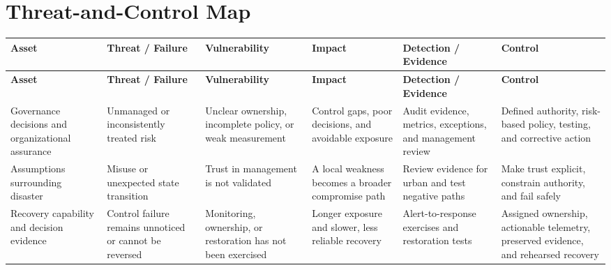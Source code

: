 \documentclass[11pt,letterpaper]{article}
\begin{document}
\section*{Threat-and-Control Map}
\begingroup\scriptsize\setlength{\tabcolsep}{2pt}
\begin{longtable}{>{\raggedright\arraybackslash}p{}>{\raggedright\arraybackslash}p{}>{\raggedright\arraybackslash}p{}>{\raggedright\arraybackslash}p{}>{\raggedright\arraybackslash}p{}>{\raggedright\arraybackslash}p{}}
\toprule\rowcolor{Navy}\color{white}\textbf{Asset} & \color{white}\textbf{Threat / Failure} & \color{white}\textbf{Vulnerability} & \color{white}\textbf{Impact} & \color{white}\textbf{Detection / Evidence} & \color{white}\textbf{Control}\\\midrule
\endfirsthead
\toprule\rowcolor{Navy}\color{white}\textbf{Asset} & \color{white}\textbf{Threat / Failure} & \color{white}\textbf{Vulnerability} & \color{white}\textbf{Impact} & \color{white}\textbf{Detection / Evidence} & \color{white}\textbf{Control}\\\midrule
\endhead
Governance decisions and organizational assurance & Unmanaged or inconsistently treated risk & Unclear ownership, incomplete policy, or weak measurement & Control gaps, poor decisions, and avoidable exposure & Audit evidence, metrics, exceptions, and management review & Defined authority, risk-based policy, testing, and corrective action\\\midrule
Assumptions surrounding disaster & Misuse or unexpected state transition & Trust in management is not validated & A local weakness becomes a broader compromise path & Review evidence for urban and test negative paths & Make trust explicit, constrain authority, and fail safely\\\midrule
Recovery capability and decision evidence & Control failure remains unnoticed or cannot be reversed & Monitoring, ownership, or restoration has not been exercised & Longer exposure and slower, less reliable recovery & Alert-to-response exercises and restoration tests & Assigned ownership, actionable telemetry, preserved evidence, and rehearsed recovery\\\midrule
\bottomrule
\end{longtable}
\endgroup
\end{document}
